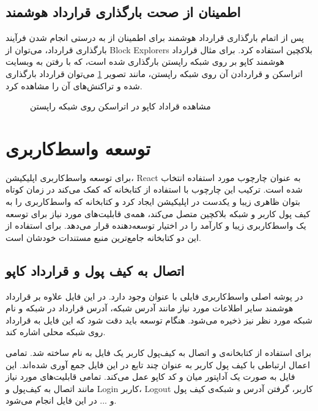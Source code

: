 \subsection{اطمینان از صحت بارگذاری قرارداد هوشمند}
پس از اتمام بارگذاری قرارداد هوشمند برای اطمینان از به درستی انجام شدن فرآیند بارگذاری قرارداد،
می‌توان از
\glspl{Block Explorer}
بلاکچین استفاده کرد.
برای مثال قرارداد هوشمند کاپو بر روی شبکه راپستن بارگذاری شده است، که با رفتن به وبسایت اتراسکن
و قراردادن آن روی شبکه راپستن، مانند تصویر
\ref{fig:etherscan}
می‌توان قرارداد بارگذاری شده و تراکنش‌های آن را مشاهده کرد.


\begin{figure}
\centerline{}
\caption{مشاهده قراداد کاپو در اتراسکن روی شبکه راپستن}
\label{fig:etherscan}
\end{figure}


\section{توسعه واسط‌کاربری}
برای توسعه واسط‌کاربری اپلیکیشن،
\gls{React}
به عنوان چارچوب مورد استفاده انتخاب شده است.
ترکیب این چارچوب با استفاده از کتابخانه
که کمک می‌کند در زمان کوتاه بتوان ظاهری زیبا و یکدست در اپلیکیشن ایجاد کرد و کتابخانه
که واسط‌کاربری را به کیف پول کاربر و شبکه بلاکچین متصل می‌کند،
همه‌ی قابلیت‌های مورد نیاز برای توسعه یک واسط‌کاربری زیبا و کارآمد را در اختیار توسعه‌دهنده قرار می‌دهد.
برای استفاده از این دو کتابخانه جامع‌ترین منبع مستندات خودشان
\cite{MuiDocs}\cite{Web3JSDocs}
است.

\subsection{اتصال به کیف پول و قرارداد کاپو}
در پوشه اصلی واسط‌کاربری فایلی با عنوان
وجود دارد.
در این فایل علاوه بر
قرارداد هوشمند سایر اطلاعات مورد نیاز مانند آدرس شبکه،
آدرس قرارداد در شبکه و نام شبکه مورد نظر نیز ذخیره می‌شود.
هنگام توسعه باید دقت شود که این فایل به قرارداد روی شبکه محلی اشاره کند.

برای استفاده از کتابخانه‌ی
و اتصال به کیف‌پول کاربر یک فایل به نام
ساخته شد.
تمامی اعمال ارتباطی با کیف پول کاربر به عنوان چند تابع در این فایل جمع آوری شده‌اند.
این فایل به صورت یک آداپتور میان
و کد کاپو عمل می‌کند. تمامی قابلیت‌های مورد نیاز مانند اتصال به کیف‌پول و
\gls{Login}
کاربر،
\gls{Logout}
کاربر، گرفتن آدرس و شبکه‌ی کیف پول و ... در این فایل انجام می‌شود.

